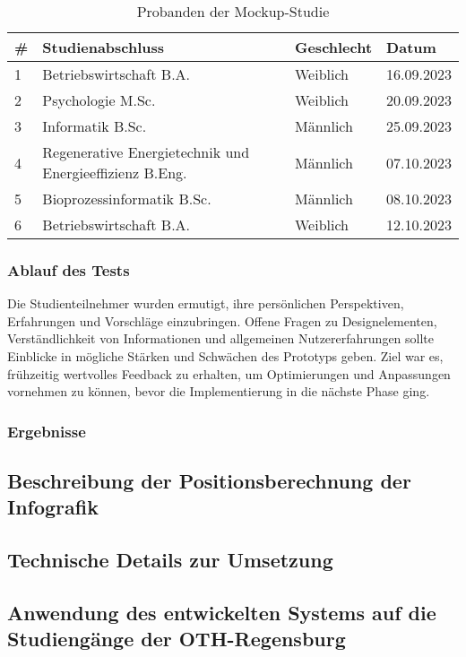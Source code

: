 \begin{table}[!ht]
    \centering
    \begin{tabular}{|l|l|l|l|}
        \hline
        \textbf{\#} & \textbf{Studienabschluss}                               & \textbf{Geschlecht} & \textbf{Datum} \\ \hline
        1           & Betriebswirtschaft B.A.                                 & Weiblich            & 16.09.2023     \\ \hline
        2           & Psychologie M.Sc.                                       & Weiblich            & 20.09.2023     \\ \hline
        3           & Informatik B.Sc.                                        & Männlich            & 25.09.2023     \\ \hline
        4           & Regenerative Energietechnik und Energieeffizienz B.Eng. & Männlich            & 07.10.2023     \\ \hline
        5           & Bioprozessinformatik B.Sc.                              & Männlich            & 08.10.2023     \\ \hline
        6           & Betriebswirtschaft B.A.                                 & Weiblich            & 12.10.2023     \\ \hline
    \end{tabular}

    \caption{Probanden der Mockup-Studie}
    \label{table:teilnehmer-mockup-studie}
\end{table}

\subsubsection{Ablauf des Tests}
Die Studienteilnehmer wurden ermutigt, ihre persönlichen Perspektiven,
Erfahrungen und Vorschläge einzubringen. Offene Fragen zu Designelementen,
Verständlichkeit von Informationen und allgemeinen Nutzererfahrungen sollte
Einblicke in mögliche Stärken und Schwächen des Prototyps geben. Ziel war es, 
frühzeitig wertvolles Feedback zu erhalten, um Optimierungen und Anpassungen
vornehmen zu können, bevor die Implementierung in die nächste Phase ging.

\subsubsection{Ergebnisse}

\subsection{Beschreibung der Positionsberechnung der Infografik}

\subsection{Technische Details zur Umsetzung}

\subsection{Anwendung des entwickelten Systems auf die Studiengänge der OTH-Regensburg}